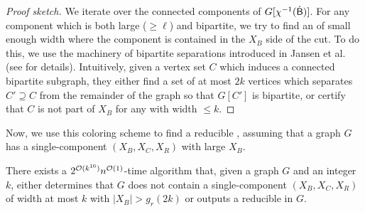 \begin{proof}[Proof sketch]
We iterate over the connected components of $G[\chi^{-1}(\mathsf{\dot{B}})]$. 
For any component which is both large ($\geq \ell$) and bipartite, we try to find an \occ of small enough width
where the component is contained in the $X_B$ side of the cut. To do this, we use the machinery of 
bipartite separations introduced in Jansen et al.~\cite{JansenKW22} (see  for details). 
Intuitively, given a vertex set $C$ which induces a connected bipartite subgraph, they either find a set of at most $2k$ vertices
which separates $C' \supseteq C$ from the remainder of the graph so that $G[C']$ is bipartite, or certify that $C$ is not part of $X_B$ for any \occ with width $\leq k$. 
\end{proof}




Now, we use this coloring scheme to find a reducible \occ,
assuming that a graph $G$ has a single-component \occ $(X_B, X_C, X_R)$ with large $X_B$.
%

\begin{lemma}\label{lem:finding-occ}
  There exists a $2^{\mathcal{O}(k^{16})} n^{\mathcal{O}(1)}$-time algorithm that,
  given a graph $G$ and an integer $k$,
  either determines that $G$ does not contain a single-component \occ $(X_B,X_C,X_R)$ of width at most $k$ with $|X_B|>g_r(2k)$ or
  outputs a reducible \occ in $G$.
\end{lemma}

